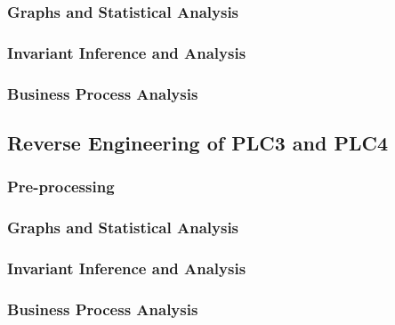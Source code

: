 \subsubsection{Graphs and Statistical Analysis}
\label{subsubsec:6_P2P3_graphs}

\subsubsection{Invariant Inference and Analysis}
\label{subsubsec:6_P2P3_invariants}

\subsubsection{Business Process Analysis}
\label{subsubsec:6_P2P3_bpa}

\subsection{Reverse Engineering of PLC3 and PLC4}
\label{subsec:6_P3P4_analysis}

\subsubsection{Pre-processing}
\label{subsubsec:6_P3P4_preprocessing}

\subsubsection{Graphs and Statistical Analysis}
\label{subsubsec:6_P3P4_graphs}

\subsubsection{Invariant Inference and Analysis}
\label{subsubsec:6_P3P4_invariants}

\subsubsection{Business Process Analysis}
\label{subsubsec:6_P3P4_bpa}

\vfill
\nolinenumbers